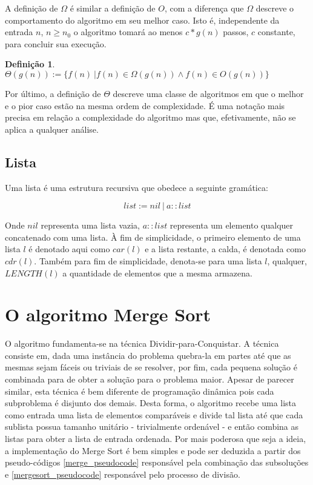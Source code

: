 \documentclass[12pt]{article}
\theoremstyle{definition}
\newtheorem{definition}{Definição}[section]
\begin{document}
A definição de $\Omega$ é similar a definição de $O$, com a diferença que $\Omega$ descreve o comportamento do algoritmo
em seu melhor caso. Isto é, independente da entrada $n$, $n \geq n_0$ o algoritmo tomará ao menos $c * g(n)$ passos, $c$ constante, para concluir
sua execução.

\theoremstyle{definition}
\begin{definition}
        $\Theta(g(n)) := \{f(n)\ | f(n) \in \Omega(g(n)) \wedge f(n) \in O(g(n))\}$        
\end{definition}

Por último, a definição de $\Theta$ descreve uma classe de algoritmos em que o melhor e o pior caso estão na mesma ordem
de complexidade. É uma notação mais precisa em relação a complexidade do algoritmo mas que, efetivamente, não se aplica
a qualquer análise.

\subsection{Lista}

Uma lista é uma estrutura recursiva que obedece a seguinte gramática:

\[list := nil\ |\ a::list\]

Onde $nil$ representa uma lista vazia, $a::list$ representa um elemento qualquer concatenado com uma lista.
À fim de simplicidade, o primeiro elemento de uma lista $l$ é denotado aqui como $car(l)$ e a lista restante,
a calda, é denotada como $cdr(l)$. Também para fim de simplicidade, denota-se para uma lista $l$, qualquer, $LENGTH(l)$ 
a quantidade de elementos que a mesma armazena. 

\section{O algoritmo Merge Sort}
\label{merge_sort}

O algoritmo fundamenta-se na técnica Dividir-para-Conquistar. A técnica consiste em, dada uma instância do problema
quebra-la em partes até que as mesmas sejam fáceis ou triviais de se resolver, por fim, cada pequena solução é combinada para
de obter a solução para o problema maior. Apesar de parecer similar, esta técnica é bem diferente de programação dinâmica pois
cada subproblema é disjunto dos demais. Desta forma, o algoritmo recebe uma lista como entrada uma lista de elementos comparáveis
e divide tal lista até que cada sublista possua tamanho unitário - trivialmente ordenável - e então combina as listas para obter
a lista de entrada ordenada. Por mais poderosa que seja a ideia, a implementação do Merge Sort é bem simples e pode ser deduzida
a partir dos pseudo-códigos \ref{merge_pseudocode} responsável pela combinação das subsoluções e \ref{mergesort_pseudocode} responsável pelo processo de
divisão.
\end{document}
